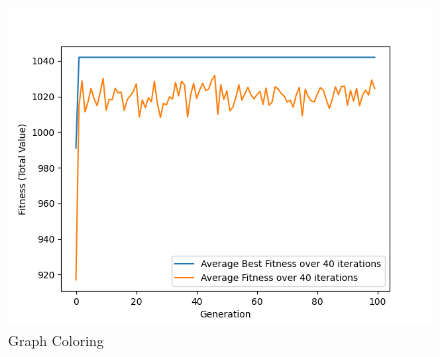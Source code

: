 \documentclass[11pt, letterpaper]{article}
\begin{document}
\begin{figure}[H]
  \includegraphics[width=\linewidth]{images/knapsack_tr_rb.png}
  \caption{Graph Coloring}
\endminipage
\end{figure}
\end{document}
